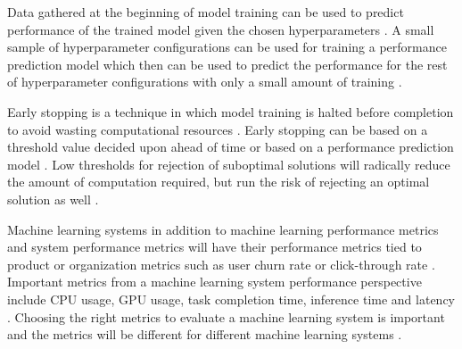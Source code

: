 Data gathered at the beginning of model training can be used to predict performance of the trained model given the chosen hyperparameters \parencite{bakerAcceleratingNeuralArchitecture2017}. A small sample of hyperparameter configurations can be used for training a performance prediction model which then can be used to predict the performance for the rest of hyperparameter configurations with only a small amount of training \parencite{bakerAcceleratingNeuralArchitecture2017}.

Early stopping is a technique in which model training is halted before completion to avoid wasting computational resources \parencite{precheltAutomaticEarlyStopping1998}. Early stopping can be based on a threshold value decided upon ahead of time or based on a performance prediction model \parencite{bakerAcceleratingNeuralArchitecture2017}. Low thresholds for rejection of suboptimal solutions will radically reduce the amount of computation required, but run the risk of rejecting an optimal solution as well \parencite{bakerAcceleratingNeuralArchitecture2017}.

Machine learning systems in addition to machine learning performance metrics and system performance metrics will have their performance metrics tied to product or organization metrics such as user churn rate or click-through rate \parencite{shankarOperationalizingMachineLearning2022}. Important metrics from a machine learning system performance perspective include CPU usage, GPU usage, task completion time, inference time and latency \parencite{cardososilvaBenchmarkingMachineLearning2020}. Choosing the right metrics to evaluate a machine learning system is important and the metrics will be different for different machine learning systems \parencite{shankarOperationalizingMachineLearning2022}.